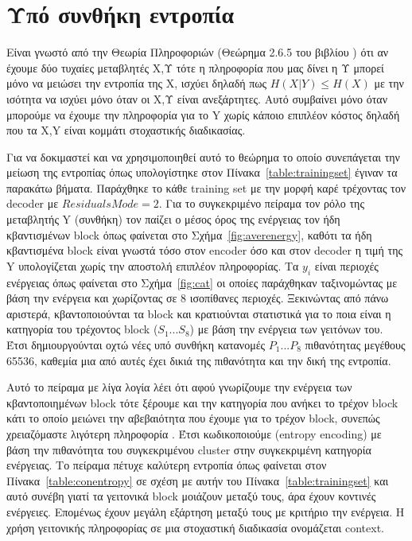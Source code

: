 \section{Υπό συνθήκη εντροπία}
\label{section:sect45}

\indent Είναι γνωστό από την Θεωρία Πληροφοριών (Θεώρημα 2.6.5 του βιβλίου \cite{cover}) ότι αν έχουμε δύο τυχαίες μεταβλητές Χ,Υ τότε η πληροφορία που μας δίνει η Υ μπορεί μόνο να μειώσει την εντροπία της Χ, ισχύει δηλαδή πως $ H(X|Y) \leq H(X)$ με την ισότητα να ισχύει μόνο όταν οι Χ,Υ είναι ανεξάρτητες. Αυτό συμβαίνει μόνο όταν μπορούμε να έχουμε την πληροφορία για το Y χωρίς κάποιο επιπλέον κόστος δηλαδή που τα X,Y είναι κομμάτι στοχαστικής διαδικασίας.

\indent Για να δοκιμαστεί και να χρησιμοποιηθεί αυτό το θεώρημα το οποίο συνεπάγεται την μείωση της εντροπίας όπως υπολογίστηκε στον Πίνακα~\ref{table:trainingset} έγιναν τα παρακάτω βήματα. Παράχθηκε το κάθε training set με την μορφή καρέ τρέχοντας τον decoder με $ResidualsMode=2$. Για το συγκεκριμένο πείραμα τον ρόλο της μεταβλητής Y (συνθήκη) τον παίζει ο μέσος όρος της ενέργειας τον ήδη κβαντισμένων block όπως φαίνεται στο Σχήμα~\ref{fig:averenergy}, καθότι τα ήδη κβαντισμένα block είναι γνωστά τόσο στον encoder όσο και στον decoder η τιμή της Y υπολογίζεται χωρίς την αποστολή επιπλέον πληροφορίας. Τα $y_i$ είναι περιοχές ενέργειας όπως φαίνεται στο Σχήμα~\ref{fig:cat} οι οποίες παράχθηκαν ταξινομώντας με βάση την ενέργεια και χωρίζοντας σε 8 ισοπίθανες περιοχές. Ξεκινώντας από πάνω αριστερά, κβαντοποιούνται τα block και κρατιούνται στατιστικά για το ποια είναι η κατηγορία του τρέχοντος block ($S_1 ... S_8$) με βάση την ενέργεια των γειτόνων του. Έτσι δημιουργούνται οχτώ νέες υπό συνθήκη κατανομές $P_1 ... P_8$ πιθανότητας μεγέθους 65536, καθεμία μια από αυτές έχει δικιά της πιθανότητα και την δική της εντροπία.

\indent Αυτό το πείραμα με λίγα λογία λέει ότι αφού γνωρίζουμε την ενέργεια των κβαντοποιημένων block τότε ξέρουμε και την κατηγορία που ανήκει το τρέχον block κάτι το οποίο μειώνει την αβεβαιότητα που έχουμε για το τρέχον block, συνεπώς χρειαζόμαστε λιγότερη πληροφορία . Έτσι κωδικοποιούμε (entropy encoding) με βάση την πιθανότητα του συγκεκριμένου cluster στην συγκεκριμένη κατηγορία ενέργειας. Το πείραμα πέτυχε καλύτερη εντροπία όπως φαίνεται στον Πίνακα~\ref{table:conentropy} σε σχέση με αυτήν του Πίνακα~\ref{table:trainingset} και αυτό συνέβη γιατί τα γειτονικά block μοιάζουν μεταξύ τους, άρα έχουν κοντινές ενέργειες. Επομένως έχουν μεγάλη εξάρτηση μεταξύ τους με κριτήριο την ενέργεια. Η χρήση γειτονικής πληροφορίας σε μια στοχαστική διαδικασία ονομάζεται context.

